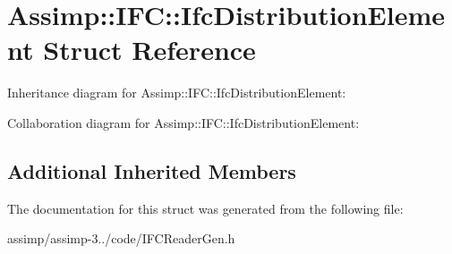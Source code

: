 \hypertarget{struct_assimp_1_1_i_f_c_1_1_ifc_distribution_element}{\section{Assimp\+:\+:I\+F\+C\+:\+:Ifc\+Distribution\+Element Struct Reference}
\label{struct_assimp_1_1_i_f_c_1_1_ifc_distribution_element}
}


Inheritance diagram for Assimp\+:\+:I\+F\+C\+:\+:Ifc\+Distribution\+Element\+:


Collaboration diagram for Assimp\+:\+:I\+F\+C\+:\+:Ifc\+Distribution\+Element\+:
\subsection*{Additional Inherited Members}


The documentation for this struct was generated from the following file\+:\begin{DoxyCompactItemize}
\item 
assimp/assimp-\/3../code/I\+F\+C\+Reader\+Gen.\+h\end{DoxyCompactItemize}

